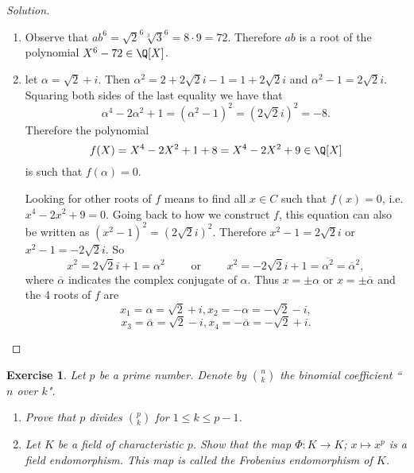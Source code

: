\documentclass[a4paper,10pt,reqno]{amsart}
\newtheorem{ex}{Exercise}[section]
\newenvironment{sol}
  {\renewcommand\qedsymbol{$\blacksquare$}\begin{proof}[Solution]}
  {\end{proof}}
\begin{document}
\begin{sol}~
    \begin{enumerate}[label=(\roman*)]
        \item Observe that $ab^6=\sqrt{2}^6\sqrt[3]{3}^6=8\cdot 9=72$.
        Therefore $ab$ is a root of the polynomial $X^6-72\in\Q[X]$.
        \item let $\alpha=\sqrt{2} + i$. 
        Then $\alpha^2=2+2\sqrt{2}i-1=1+2\sqrt{2}i$ and $\alpha^2-1=2\sqrt{2}i$.
        Squaring both sides of the last equality we have that
        \[
         \alpha^4-2\alpha^2+1=(\alpha^2-1)^2=(2\sqrt{2}i)^2=-8.
        \]
        Therefore the polynomial 
        \[
        f(X)=X^4-2X^2+1+8=X^4-2X^2+9\in \Q[X]
        \]
        is such that $f(\alpha)=0$.

        Looking for other roots of $f$ means to find all $x\in C$
        such that $f(x)=0$, i.e. $x^4-2x^2+9=0$. 
        Going back to how we construct $f$, this equation 
        can also be written as $(x^2-1)^2=(2\sqrt{2}i)^2$.
        Therefore $x^2-1=2\sqrt{2}i$ or $x^2-1=-2\sqrt{2}i$.
        So 
        \[
        x^2=2\sqrt{2}i+1=\alpha^2\qquad\text{ or } \qquad x^2=-2\sqrt{2}i+1=\overline{\alpha^2}=\overline{\alpha}^2,
        \]
        where $\overline{\alpha}$ indicates the complex conjugate of 
        $\alpha$.
        Thus $x=\pm \alpha$ or $x=\pm \overline{\alpha}$ and the 4 roots of $f$ are
        \[
        x_1=\alpha=\sqrt{2} + i, x_2=-\alpha=-\sqrt{2} - i,
        \]
        \[
        x_3=\overline{\alpha}=\sqrt{2} - i, x_4=-\overline{\alpha}=-\sqrt{2} + i.
        \]
    \end{enumerate}
\end{sol}

\begin{ex}
\label{1.5}
Let $p$ be a prime number. Denote by $\binom{n}{k}$ the binomial coefficient ``$n$ over $k$".
    \begin{enumerate}[label=(\roman*)]
    \item Prove that $p$ divides $\binom{p}{k}$ for $1 \leq k \leq p-1$.
    \item Let $K$ be a field of characteristic $p$. Show that the map $\Phi: K \to K$; $x \mapsto x^p$ is a field endomorphism. This map is called the \emph{Frobenius endomorphism} of $K$.
\end{enumerate}
\end{ex}
\end{document}
